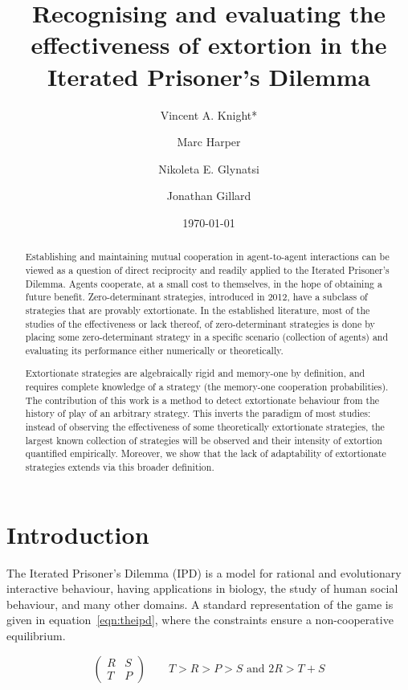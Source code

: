 \documentclass[a4paper]{article}
\title{Recognising and evaluating the effectiveness
       of extortion in the Iterated Prisoner's Dilemma}
\author[1]{Vincent A. Knight*}
\author[2]{Marc Harper}
\author[1]{Nikoleta E. Glynatsi}
\author[1]{Jonathan Gillard}
\affil[1]{Cardiff University, School of Mathematics, Cardiff, United Kingdom}
\affil[2]{Google Inc., Mountain View, CA, United States of America}
\date{\today}
\begin{document}
\maketitle

\begin{abstract}

Establishing and maintaining mutual cooperation in agent-to-agent interactions
can be viewed as a question of direct reciprocity and
readily applied to the Iterated Prisoner's Dilemma. Agents cooperate, at a
small cost to themselves, in the hope of obtaining a future benefit.
Zero-determinant strategies, introduced in 2012, have a subclass of
strategies that are provably extortionate. In the established literature,
most of the studies of the effectiveness or lack
thereof, of zero-determinant strategies is done by placing some
zero-determinant strategy in a specific scenario (collection of agents) and
evaluating its performance either numerically or theoretically.

Extortionate strategies are algebraically rigid and memory-one by definition,
and requires complete knowledge of a strategy (the memory-one cooperation
probabilities). The contribution of this work is a method to detect
extortionate behaviour from the history of play of an arbitrary strategy. This inverts
the paradigm of most studies: instead of observing the effectiveness of some
theoretically extortionate strategies, the largest known collection of
strategies will be observed and their intensity of extortion quantified empirically.
Moreover, we show that the lack of adaptability of extortionate strategies
extends via this broader definition.
\end{abstract}

\section{Introduction}

The Iterated Prisoner's Dilemma (IPD) is a model for rational and evolutionary
interactive behaviour, having applications in biology, the study of human social
behaviour, and many other domains. A standard representation  of the game is
given in equation~\ref{eqn:theipd}, where the constraints ensure a
non-cooperative equilibrium.

\begin{equation}
    \begin{pmatrix}
        R & S \\
        T & P
    \end{pmatrix}
    \qquad
    T > R > P > S\text{ and }2 R > T + S
    \label{eqn:theipd}
\end{equation}
\end{document}
